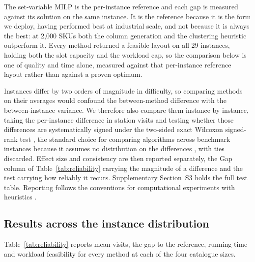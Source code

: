 \documentclass[]{interact}
\begin{document}
The set-variable MILP is the per-instance reference and each gap is measured against its solution on the same instance. It is the reference because it is the form we deploy, having performed best at industrial scale, and not because it is always the best: at 2,000 SKUs both the column generation and the clustering heuristic outperform it. Every method returned a feasible layout on all 29 instances, holding both the slot capacity and the workload cap, so the comparison below is one of quality and time alone, measured against that per-instance reference layout rather than against a proven optimum.

Instances differ by two orders of magnitude in difficulty, so comparing methods on their averages would confound the between-method difference with the between-instance variance. We therefore also compare them instance by instance, taking the per-instance difference in station visits and testing whether those differences are systematically signed under the two-sided exact Wilcoxon signed-rank test \citep{wilcoxon1945}, the standard choice for comparing algorithms across benchmark instances because it assumes no distribution on the differences \citep{demsar2006}, with ties discarded. Effect size and consistency are then reported separately, the Gap column of Table~\ref{tab:reliability} carrying the magnitude of a difference and the test carrying how reliably it recurs. Supplementary Section~S3 holds the full test table. Reporting follows the conventions for computational experiments with heuristics \citep{barr1995designing, hooker1995testing}.



\subsection{Results across the instance distribution}\label{sec:reliability}
Table~\ref{tab:reliability} reports mean visits, the gap to the reference, running time and workload feasibility for every method at each of the four catalogue sizes.
\end{document}
